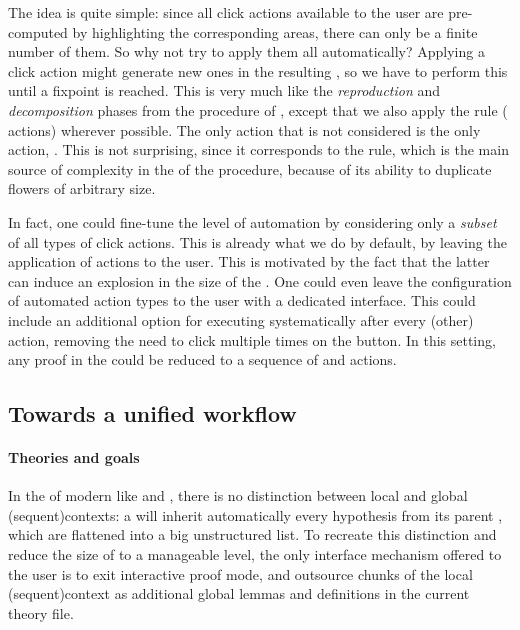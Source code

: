 \begin{scope}
The idea is quite simple: since all click actions available to the user are
pre-computed by highlighting the corresponding areas, there can only be a finite
number of them. So why not try to apply them all automatically? Applying a click
action might generate new ones in the resulting , so we have to perform this
until a fixpoint is reached. This is very much like the \emph{reproduction} and
\emph{decomposition} phases from the  procedure of
, except that we also apply the  rule
( actions) wherever possible. The only \Proof action that is not
considered is the only  action, . This is not surprising,
since it corresponds to the  rule, which is the main source of
complexity in the  of the  procedure,
because of its ability to duplicate flowers of arbitrary size.

In fact, one could fine-tune the level of automation by considering only a
\emph{subset} of all types of click actions. This is already what we do by
default, by leaving the application of  actions to the user. This
is motivated by the fact that the latter can induce an explosion in the size of
the . One could even leave the configuration of automated action types to
the user with a dedicated interface. This could include an additional option for
executing  systematically after every (other) \Proof action,
removing the need to click multiple times on the  button. In this
setting, any proof in the  could be reduced to a sequence of
 and  actions.


\subsection{Towards a unified workflow}

\paragraph{Theories and goals}

In the  of modern  like  and
, there is no distinction between local and global
\kl(sequent){contexts}: a  will inherit automatically every
hypothesis from its parent , which are flattened into a big
unstructured list. To recreate this distinction and reduce the size of
 to a manageable level, the only interface mechanism offered to the
user is to exit interactive proof mode, and outsource chunks of the local
\kl(sequent){context} as additional global lemmas and definitions in the current
theory file.


\end{scope}
